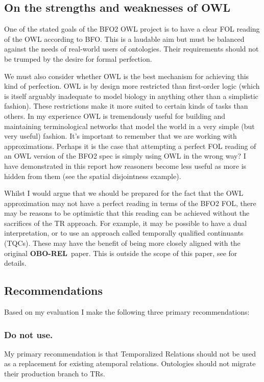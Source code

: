 \documentclass{bioinfo}
\def\OBOREL{\textbf{OBO-REL}}
\begin{document}
\subsection{On the strengths and weaknesses of OWL}

One of the stated goals of the BFO2 OWL project is to have a clear FOL
reading of the OWL according to BFO. This is a laudable aim but must
be balanced against the needs of real-world users of ontologies. Their
requirements should not be trumped by the desire for formal perfection.

We must also consider whether OWL is the best mechanism for achieving
this kind of perfection. OWL is by design more restricted than
first-order logic (which is itself arguably inadequate to model
biology in anything other than a simplistic fashion). These
restrictions make it more suited to certain kinds of tasks than
others. In my experience OWL is tremendously useful for building and
maintaining terminological networks that model the world in a very
simple (but very useful) fashion. It's important to remember that we
are working with approximations. Perhaps it is the case that
attempting a perfect FOL reading of an OWL version of the BFO2 spec is
simply using OWL in the wrong way? I have demonstrated in this report
how reasoners become less useful as more is hidden from them (see the
spatial disjointness example).

Whilst I would argue that we should be prepared for the fact that the
OWL approximation may not have a perfect reading in terms of the BFO2
FOL, there may be reasons to be optimistic that this reading can be
achieved without the sacrifices of the TR approach. For example, it
may be possible to have a dual interpretation, or to use an approach
called temporally qualified continuants (TQCs). These may have the
benefit of being more closely aligned with the original \OBOREL\
paper. This is outside the scope of this paper, see \cite{Grewe} for
details.

\subsection{Recommendations}

Based on my evaluation I make the following three primary
recommendations:

\subsubsection{Do not use.} My primary recommendation is that
Temporalized Relations should not be used as a replacement for
existing atemporal relations. Ontologies should not migrate their
production branch to TRs.
\end{document}

